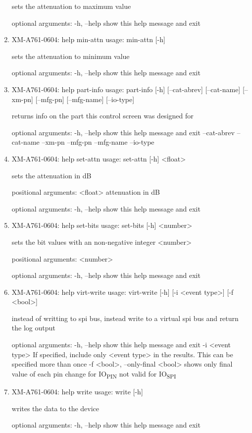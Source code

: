 \documentclass[11pt]{article}
\begin{document}
\begin{enumerate}
sets the attenuation to maximum value

optional arguments:
  -h, --help  show this help message and exit

\item XM-A761-0604: help min-attn
\label{sec:orgcde7376}
usage: min-attn [-h]

sets the attenuation to minimum value

optional arguments:
  -h, --help  show this help message and exit

\item XM-A761-0604: help part-info
\label{sec:orgd0b3354}
usage: part-info  [-h] [--cat-abrev] [--cat-name] [--xm-pn] [--mfg-pn] [--mfg-name]
        [--io-type]

returns info on the part this control screen was designed for

optional arguments:
  -h, --help   show this help message and exit
  --cat-abrev
  --cat-name
  --xm-pn
  --mfg-pn
  --mfg-name
  --io-type

\item XM-A761-0604: help set-attn
\label{sec:orga7a6df5}
usage: set-attn [-h] <float>

sets the attenuation in dB

positional arguments:
  <float>     attenuation in dB

optional arguments:
  -h, --help  show this help message and exit

\item XM-A761-0604: help set-bits
\label{sec:org1d3073b}
usage: set-bits [-h] <number>

sets the bit values with an non-negative integer <number>

positional arguments:
  <number>

optional arguments:
  -h, --help  show this help message and exit

\item XM-A761-0604: help virt-write
\label{sec:org9b0f328}
usage: virt-write [-h] [-i <event type>] [-f <bool>]

instead of writting to spi bus, instead write to a virtual spi bus and return
the log output

optional arguments:
  -h, --help            show this help message and exit
  -i <event type>       If specified, include only <event type> in the
                        results. This can be specified more than once
  -f <bool>, --only-final <bool>
                        shows only final value of each pin change for IO\textsubscript{PIN}
                        not valid for IO\textsubscript{SPI}

\item XM-A761-0604: help write
\label{sec:org79b04c6}
usage: write [-h]

writes the data to the device

optional arguments:
  -h, --help  show this help message and exit
\end{enumerate}
\end{document}
